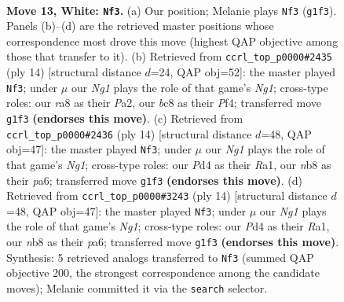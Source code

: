 \documentclass[11pt]{article}
\begin{document}
\clearpage

\begin{figure}[p]\centering
\begin{subfigure}{0.46\textwidth}\centering
\resizebox{\linewidth}{!}{%
\newchessgame
\chessboard[
  setfen={rnbq1rk1/1p1n1ppp/2p1p3/p2pP3/3P1P2/2N5/PPP3PP/2RQKBNR w K - 0 13},
  showmover=false,
  pgfstyle=straightmove, color=movearrow, markmove={g1-f3}
]}
\caption{}
\end{subfigure}\hfill
\begin{subfigure}{0.46\textwidth}\centering
\resizebox{\linewidth}{!}{%
\newchessgame
\chessboard[
  setfen={rnb2rk1/pppnqppp/4p3/3pP3/3P1P2/2N5/PPP3PP/R2QKBNR w KQ - 1 8},
  showmover=false,
  pgfstyle=straightmove, color=movearrow, markmove={g1-f3}
]}
\caption{}
\end{subfigure}
\\[4pt]
\begin{subfigure}{0.46\textwidth}\centering
\resizebox{\linewidth}{!}{%
\newchessgame
\chessboard[
  setfen={rnb1k2r/1ppnqppp/p3p3/3pP3/3P1P2/2N5/PPP3PP/R2QKBNR w KQkq - 0 8},
  showmover=false,
  pgfstyle=straightmove, color=movearrow, markmove={g1-f3}
]}
\caption{}
\end{subfigure}\hfill
\begin{subfigure}{0.46\textwidth}\centering
\resizebox{\linewidth}{!}{%
\newchessgame
\chessboard[
  setfen={rnb1k2r/1ppnqppp/p3p3/3pP3/3P1P2/2N5/PPP3PP/R2QKBNR w KQkq - 0 8},
  showmover=false,
  pgfstyle=straightmove, color=movearrow, markmove={g1-f3}
]}
\caption{}
\end{subfigure}
\caption{\textbf{Move 13, White: \texttt{Nf3}.} (a) Our position; Melanie plays \texttt{Nf3} (\texttt{g1f3}). Panels (b)--(d) are the retrieved master positions whose correspondence most drove this move (highest QAP objective among those that transfer to it). (b) Retrieved from \texttt{ccrl\_top\_p0000\#2435} (ply 14) [structural distance $d$=24, QAP obj=52]: the master played \texttt{Nf3}; under $\mu$ our \emph{Ng1} plays the role of that game's \emph{Ng1}; cross-type roles: our \emph{r}a8 as their \emph{P}a2, our \emph{b}c8 as their \emph{P}f4; transferred move \texttt{g1f3} \textbf{(endorses this move)}. (c) Retrieved from \texttt{ccrl\_top\_p0000\#2436} (ply 14) [structural distance $d$=48, QAP obj=47]: the master played \texttt{Nf3}; under $\mu$ our \emph{Ng1} plays the role of that game's \emph{Ng1}; cross-type roles: our \emph{P}d4 as their \emph{R}a1, our \emph{n}b8 as their \emph{p}a6; transferred move \texttt{g1f3} \textbf{(endorses this move)}. (d) Retrieved from \texttt{ccrl\_top\_p0000\#3243} (ply 14) [structural distance $d$=48, QAP obj=47]: the master played \texttt{Nf3}; under $\mu$ our \emph{Ng1} plays the role of that game's \emph{Ng1}; cross-type roles: our \emph{P}d4 as their \emph{R}a1, our \emph{n}b8 as their \emph{p}a6; transferred move \texttt{g1f3} \textbf{(endorses this move)}. Synthesis: 5 retrieved analogs transferred to \texttt{Nf3} (summed QAP objective 200, the strongest correspondence among the candidate moves); Melanie committed it via the \texttt{search} selector.}
\label{fig:thought-m24}
\end{figure}
\end{document}
